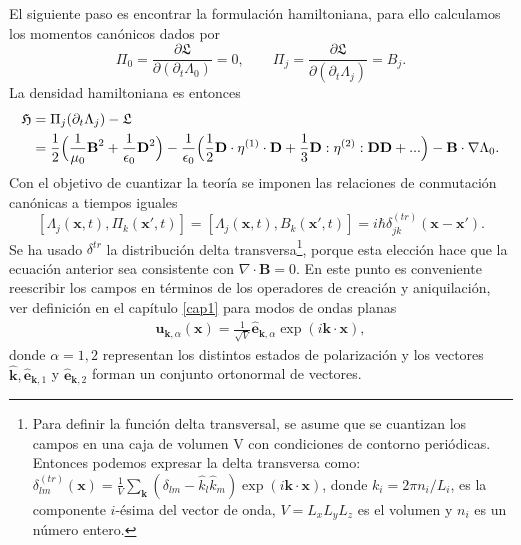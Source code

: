 El siguiente paso es encontrar la formulación hamiltoniana, para ello calculamos los momentos canónicos dados por
\begin{equation}
\Pi_0=\frac{\partial\mathfrak{L}}{\partial(\partial_t\Lambda_0)}=0, \qquad \Pi_j=\frac{\partial\mathfrak{L}}{\partial(\partial_t\Lambda_j)}=B_j.
\end{equation}
La densidad hamiltoniana es entonces
\begin{align}
\nonumber \mathfrak{H}&=\Pi_j(\partial_t \Lambda_j)-\mathfrak{L}\\
&=\frac{1}{2}\Bigl(\frac{1}{\mu_0}\textbf{B}^2+\frac{1}{\epsilon_0}\textbf{D}^2\Bigr)-\frac{1}{\epsilon_0}\Bigl(\frac{1}{2}\textbf{D}\cdot
\eta^{(1)}\cdot\textbf{D}+\frac{1}{3}\textbf{D}:\eta^{(2)}:\textbf{D}\textbf{D}+...\Bigr)-\textbf{B}\cdot\nabla \Lambda_0.
\end{align}
Con el objetivo de cuantizar la teoría se imponen las relaciones de conmutación canónicas a tiempos iguales
\begin{equation}\label{ec:conmutador}
[\Lambda_j(\textbf{x},t),\Pi_k(\textbf{x}',t)]=[\Lambda_j(\textbf{x},t),
B_k(\textbf{x}',t)]=i\hbar\delta_{jk}^{(tr)}(\textbf{x}-\textbf{x}').
\end{equation}
Se ha usado $\delta^{tr}$ la distribuci\'{o}n delta transversa\footnote{Para definir la función delta transversal, se asume que se cuantizan los campos
en una caja de volumen V con condiciones de contorno periódicas. Entonces podemos expresar la delta transversa como: $\delta^{(tr)}_{lm}(\textbf{x})=\frac{1}{V}\sum_\textbf{k}(\delta_{lm}-\widehat{k}_l\widehat{k}_m)\exp(i\textbf{k}\cdot \textbf{x})$, donde $k_i=2\pi n_i/L_i$, es la componente $i$-\'{e}sima del vector de onda, $V=L_xL_yL_z$ es el volumen y $n_i$ es un n\'{u}mero entero.}, porque esta elección hace que la ecuaci\'{o}n anterior sea consistente con  $\nabla \cdot\textbf{B}=0$. En este punto es conveniente reescribir los campos en t\'{e}rminos de los operadores de creaci\'{o}n y aniquilaci\'{o}n, ver definici\'{o}n en el cap\'{i}tulo \ref{cap1} para modos de ondas planas
\begin{align}
\textbf{u}_{\textbf{k},\alpha}(\textbf{x})=\frac{1}{\sqrt{V}}\widehat{\textbf{e}}_{\textbf{k},\alpha}\exp(i\textbf{k}\cdot\textbf{x}),
\end{align}
donde $\alpha=1,2$ representan los distintos estados de polarizaci\'{o}n y los vectores $\widehat{\textbf{k}},\widehat{\textbf{e}}_{\textbf{k},1}$ y $\widehat{\textbf{e}}_{\textbf{k},2}$ forman un conjunto ortonormal de vectores.\\

